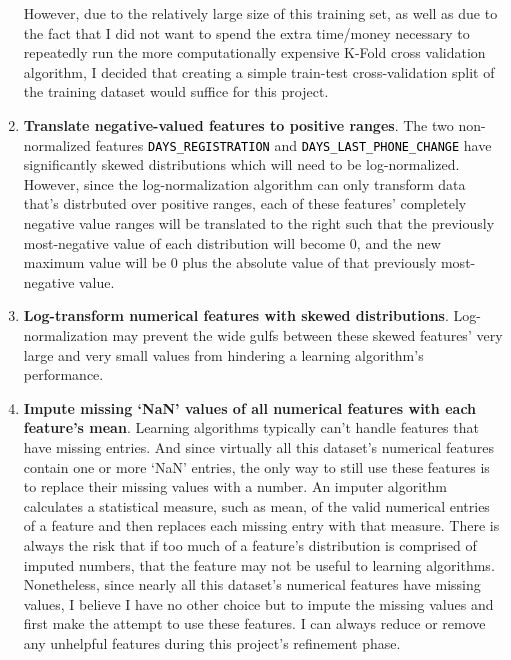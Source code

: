 \documentclass[12pt, letterpaper]{article}
\begin{document}
\begin{enumerate}
  However, due to the relatively large size of this training set, as well as due to the fact that I did not want to spend the extra time/money necessary to repeatedly run the more computationally expensive K-Fold cross validation algorithm, I decided that creating a simple train-test cross-validation split of the training dataset would suffice for this project.
  \item \textbf{Translate negative-valued features to positive ranges}. The two non-normalized features \colorbox{backcolor}{\textcolor{black}{\texttt{DAYS_REGISTRATION}}} and \colorbox{backcolor}{\textcolor{black}{\texttt{DAYS_LAST_PHONE_CHANGE}}} have significantly skewed distributions which will need to be log-normalized. However, since the log-normalization algorithm can only transform data that's distrbuted over positive ranges, each of these features' completely negative value ranges will be translated to the right such that the previously most-negative value of each distribution will become 0, and the new maximum value will be 0 plus the absolute value of that previously most-negative value.
  \item \textbf{Log-transform numerical features with skewed distributions}. Log-normalization may prevent the wide gulfs between these skewed features' very large and very small values from hindering a learning algorithm's performance.
  \item \textbf{Impute missing `NaN' values of all numerical features with each feature's mean}. Learning algorithms typically can't handle features that have missing entries. And since virtually all this dataset's numerical features contain one or more `NaN' entries, the only way to still use these features is to replace their missing values with a number. An imputer algorithm calculates a statistical measure, such as mean, of the valid numerical entries of a feature and then replaces each missing entry with that measure. There is always the risk that if too much of a feature's distribution is comprised of imputed numbers, that the feature may not be useful to learning algorithms. Nonetheless, since nearly all this dataset's numerical features have missing values, I believe I have no other choice but to impute the missing values and first make the attempt to use these features. I can always reduce or remove any unhelpful features during this project's refinement phase.

\end{enumerate}
\end{document}
